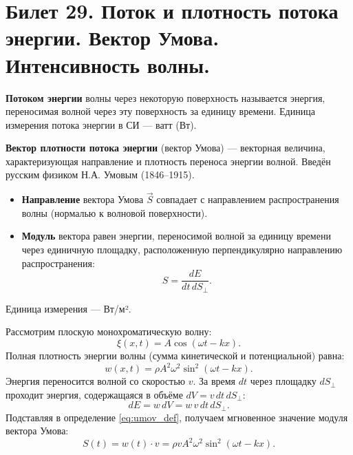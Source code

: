 \section{Билет 29. Поток и плотность потока энергии. Вектор Умова. Интенсивность волны.}

\begin{definition}
\textbf{Потоком энергии} волны через некоторую поверхность называется энергия, переносимая волной через эту поверхность за единицу времени. Единица измерения потока энергии в СИ --- ватт (Вт).
\end{definition}

\begin{definition}
\textbf{Вектор плотности потока энергии} (вектор Умова) --- векторная величина, характеризующая направление и плотность переноса энергии волной. Введён русским физиком Н.А. Умовым (1846--1915).
\begin{itemize}
    \item \textbf{Направление} вектора Умова $\vec{S}$ совпадает с направлением распространения волны (нормалью к волновой поверхности).
    \item \textbf{Модуль} вектора равен энергии, переносимой волной за единицу времени через единичную площадку, расположенную перпендикулярно направлению распространения:
    \begin{equation}
        S = \frac{dE}{dt \, dS_{\perp}}. \label{eq:umov_def}
    \end{equation}
\end{itemize}
Единица измерения --- Вт/м².
\end{definition}

\begin{theorem}
Рассмотрим плоскую монохроматическую волну:
\begin{equation}
    \xi(x,t) = A \cos(\omega t - kx).
\end{equation}
Полная плотность энергии волны (сумма кинетической и потенциальной) равна:
\begin{equation}
    w(x,t) = \rho A^2 \omega^2 \sin^2(\omega t - kx). \label{eq:energy_density_29}
\end{equation}
Энергия переносится волной со скоростью $v$. За время $dt$ через площадку $dS_{\perp}$ проходит энергия, содержащаяся в объёме $dV = v \, dt \, dS_{\perp}$:
\begin{equation}
    dE = w \, dV = w \, v \, dt \, dS_{\perp}.
\end{equation}
Подставляя в определение \eqref{eq:umov_def}, получаем мгновенное значение модуля вектора Умова:
\begin{equation}
    S(t) = w(t) \cdot v = \rho v A^2 \omega^2 \sin^2(\omega t - kx). \label{eq:umov_instant}
\end{equation}
\end{theorem}


